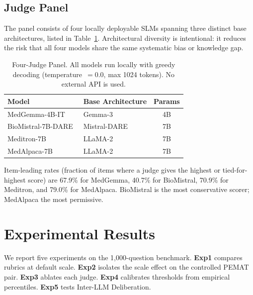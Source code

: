 \documentclass[conference]{IEEEtran}
\begin{document}
\subsection{Judge Panel}

The panel consists of four locally deployable SLMs spanning three
distinct base architectures, listed in Table~\ref{tab:judges}.
Architectural diversity is intentional: it reduces the risk that
all four models share the same systematic bias or knowledge gap.

\begin{table}[htbp]
\caption{Four-Judge Panel. All models run locally with greedy
decoding (temperature~$=0.0$, max 1024 tokens). No external API is used.}
\label{tab:judges}
\begin{flushleft}
\small
\setlength{\tabcolsep}{4pt}
\begin{tabular}{|l|l|c|}
\hline
\textbf{Model} & \textbf{Base Architecture} & \textbf{Params} \\
\hline
MedGemma-4B-IT~\cite{sellergren2025medgemma}   & Gemma-3      & 4B \\
BioMistral-7B-DARE~\cite{labrak2024biomistral} & Mistral-DARE & 7B \\
Meditron-7B~\cite{chen2023meditron}         & LLaMA-2      & 7B \\
MedAlpaca-7B~\cite{han2023medalpaca}           & LLaMA-2      & 7B \\
\hline
\end{tabular}
\end{flushleft}
\end{table}

Item-leading rates (fraction of items where a judge gives the
highest or tied-for-highest score) are 67.9\% for MedGemma, 40.7\%
for BioMistral, 70.9\% for Meditron, and 79.0\% for MedAlpaca.
BioMistral is the most conservative scorer; MedAlpaca the most
permissive.

\section{Experimental Results}

We report five experiments on the 1,000-question benchmark.
\textbf{Exp1} compares rubrics at default scale. \textbf{Exp2}
isolates the scale effect on the controlled PEMAT pair.
\textbf{Exp3} ablates each judge. \textbf{Exp4} calibrates
thresholds from empirical percentiles. \textbf{Exp5} tests
Inter-LLM Deliberation.
\end{document}
